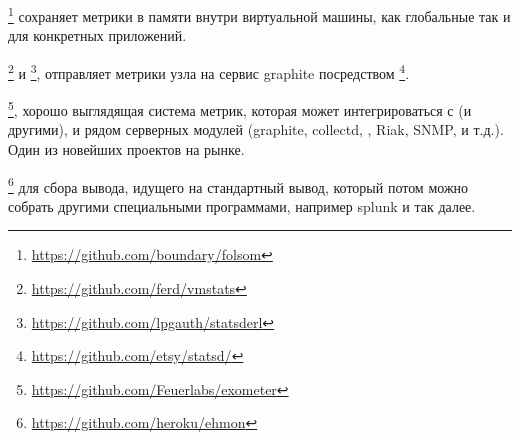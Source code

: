 \documentclass[11pt, oneside]{book}   	%
\begin{document}
\begin{itemize*}
	\item {}\footnote{\href{https://github.com/boundary/folsom}{https://github.com/boundary/folsom}} сохраняет метрики в памяти внутри виртуальной машины, как глобальные так и для конкретных приложений.
	\item {}\footnote{\href{https://github.com/ferd/vmstats}{https://github.com/ferd/vmstats}} и \footnote{\href{https://github.com/lpgauth/statsderl}{https://github.com/lpgauth/statsderl}}, отправляет метрики узла на сервис graphite посредством \footnote{\href{https://github.com/etsy/statsd/}{https://github.com/etsy/statsd/}}.
	\item {}\footnote{\href{https://github.com/Feuerlabs/exometer}{https://github.com/Feuerlabs/exometer}}, хорошо выглядящая система метрик, которая может интегрироваться с  (и другими), и рядом серверных модулей (graphite, collectd, , Riak, SNMP, и т.д.). Один из новейших проектов на рынке.
	\item {}\footnote{\href{https://github.com/heroku/ehmon}{https://github.com/heroku/ehmon}} для сбора вывода, идущего на стандартный вывод, который потом можно собрать другими специальными программами, например splunk и так далее.

\end{itemize*}
\end{document}
